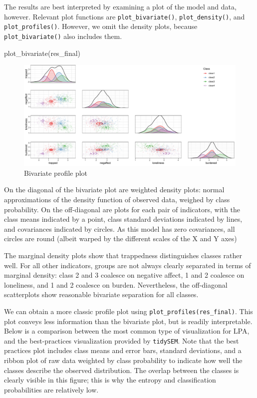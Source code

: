 \documentclass[
  man,floatsintext]{apa6}
\newenvironment{Shaded}{\begin{snugshade}}{\end{snugshade}}
\newcommand{\FunctionTok}[1]{\textcolor[rgb]{0.00,0.00,0.00}{#1}}
\newcommand{\NormalTok}[1]{#1}
\begin{document}
The results are best interpreted by examining a plot of the model and data, however.
Relevant plot functions are \texttt{plot\_bivariate()}, \texttt{plot\_density()}, and \texttt{plot\_profiles()}.
However, we omit the density plots, because \texttt{plot\_bivariate()} also includes them.

\begin{Shaded}
\begin{Highlighting}[]
\FunctionTok{plot\_bivariate}\NormalTok{(res\_final)}
\end{Highlighting}
\end{Shaded}

\begin{figure}
\includegraphics[width=1\linewidth]{appendices/lpa_bivariate} \caption{Bivariate profile plot}\label{fig:unnamed-chunk-16}
\end{figure}

On the diagonal of the bivariate plot are weighted density plots: normal approximations of the density function of observed data, weighed by class probability.
On the off-diagonal are plots for each pair of indicators, with the class means indicated by a point, class standard deviations indicated by lines, and covariances indicated by circles.
As this model has zero covariances, all circles are round (albeit warped by the different scales of the X and Y axes)

The marginal density plots show that trappedness distinguishes classes rather well.
For all other indicators, groups are not always clearly separated in terms of marginal density: class 2 and 3 coalesce on negative affect, 1 and 2 coalesce on loneliness, and 1 and 2 coalesce on burden.
Nevertheless, the off-diagonal scatterplots show reasonable bivariate separation for all classes.

We can obtain a more classic profile plot using \texttt{plot\_profiles(res\_final)}.
This plot conveys less information than the bivariate plot, but is readily interpretable.
Below is a comparison between the most common type of visualization for LPA, and the best-practices visualization provided by \texttt{tidySEM}.
Note that the best practices plot includes class means and error bars, standard deviations, and a ribbon plot of raw data weighted by class probability to indicate how well the classes describe the observed distribution.
The overlap between the classes is clearly visible in this figure; this is why the entropy and classification probabilities are relatively low.
\end{document}
